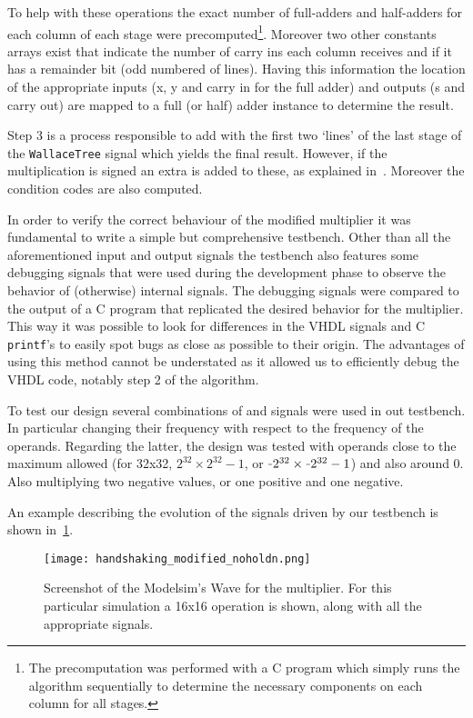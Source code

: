 To help with these operations the exact number of full-adders and half-adders for each column of each stage were precomputed\footnote{The precomputation was performed with a C program which simply runs the algorithm sequentially to determine the necessary components on each column for all stages.}. Moreover two other constants arrays exist that indicate the number of carry ins each column receives and if it has a remainder bit (odd numbered of lines).
Having this information the location of the appropriate inputs (x, y and carry in for the full adder) and outputs (s and carry out) are mapped to a full (or half) adder instance to determine the result.

Step 3 is a process responsible to add with the first two `lines' of the last stage of the \texttt{WallaceTree} signal which yields the final result. However, if the multiplication is signed an extra \STDV is added to these, as explained in~\cite{part3}. Moreover the condition codes are also computed.


In order to verify the correct behaviour of the modified multiplier it was fundamental to write a simple but comprehensive testbench.
Other than all the aforementioned input and output signals the testbench also features some debugging signals that were used during the development phase to observe the behavior of (otherwise) internal signals. The debugging signals were compared to the output of a C program that replicated the desired behavior for the multiplier. This way it was possible to look for differences in the VHDL signals and C \texttt{printf}'s to easily spot bugs as close as possible to their origin. The advantages of using this method cannot be understated as it allowed us to efficiently debug the VHDL code, notably step 2 of the algorithm.

To test our design several combinations of \holdn and \start signals were used in out testbench. In particular changing their frequency with respect to the frequency of the operands.
Regarding the latter, the design was tested with operands close to the maximum allowed (\eg for 32x32, $2^{32} \times 2^{32}-1$, or $\unaryminus 2^{32} \times \unaryminus 2^{32}-1$) and also around 0. Also multiplying two negative values, or one positive and one negative.

An example describing the evolution of the signals driven by our testbench is shown in~\ref{fig:mul32_wave}.

\begin{figure}[H]
\centering
\texttt{[image: handshaking\_modified\_noholdn.png]}
\caption{Screenshot of the Modelsim's Wave for the multiplier. For this particular simulation a 16x16 operation is shown, along with all the appropriate signals.}
\label{fig:mul32_wave}
\end{figure}

